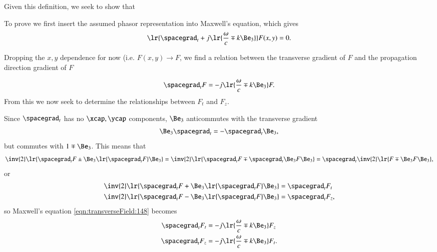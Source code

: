 Given this definition, we seek to show that


To prove we first insert the assumed phasor representation into Maxwell's equation, which gives
\begin{equation}\label{eqn:transverseField:summaryMax2}
\lr{\spacegrad_t + j \lr{ \frac{\omega}{c} \mp k \Be_3 } } F(x,y) = 0.
\end{equation}

Dropping the \( x, y \) dependence for now (i.e.  \( F(x, y) \rightarrow F \), we find a relation between the transverse gradient of \( F \) and the propagation direction gradient of \( F \)

\begin{dmath}\label{eqn:transverseField:148}
\spacegrad_t F = - j \lr{ \frac{\omega}{c} \mp k \Be_3 } F.
\end{dmath}
From this we now seek to determine the relationships between \( F_t \) and \( F_z \).

Since \( \spacegrad_t \) has no \( \xcap, \ycap \) components, \( \Be_3 \) anticommutes with the transverse gradient
\begin{dmath}\label{eqn:transverseField:168}
\Be_3 \spacegrad_t = - \spacegrad_t \Be_3,
\end{dmath}
but commutes with \( 1 \mp \Be_3 \).
This means that
\begin{dmath}\label{eqn:transverseField:188}
\inv{2} \lr{ \spacegrad_t F \pm \Be_3 \lr{ \spacegrad_t F } \Be_3 }
=
\inv{2} \lr{ \spacegrad_t F \mp \spacegrad_t \Be_3 F \Be_3 }
=
\spacegrad_t
\inv{2} \lr{ F \mp \Be_3 F \Be_3 },
\end{dmath}
or
\begin{dmath}\label{eqn:transverseField:208}
\begin{aligned}
\inv{2} \lr{ \spacegrad_t F + \Be_3 \lr{ \spacegrad_t F } \Be_3 } &= \spacegrad_t F_t \\
\inv{2} \lr{ \spacegrad_t F - \Be_3 \lr{ \spacegrad_t F } \Be_3 } &= \spacegrad_t F_z,
\end{aligned}
\end{dmath}
so Maxwell's equation \cref{eqn:transverseField:148} becomes
\begin{dmath}\label{eqn:transverseField:228}
\begin{aligned}
\spacegrad_t F_t &= - j \lr{ \frac{\omega}{c} \mp k \Be_3 } F_z \\
\spacegrad_t F_z &= - j \lr{ \frac{\omega}{c} \mp k \Be_3 } F_t.
\end{aligned}
\end{dmath}

